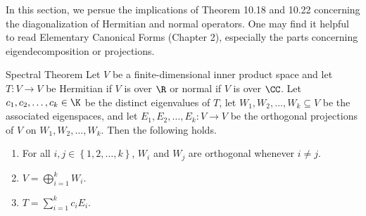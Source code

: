 \documentclass[linearalgebra]{subfiles}
\begin{document}
    \begin{remark}
        In this section, we persue the implications of Theorem 10.18 and 10.22 concerning the diagonalization of Hermitian and normal operators. One may find it helpful to read Elementary Canonical Forms (Chapter 2), especially the parts concerning eigendecomposition or projections.
    \end{remark}

    \begin{theorem}{Spectral Theorem}
        Let $V$ be a finite-dimensional inner product space and let $T:V\to V$ be Hermitian if $V$ is over $\R$ or normal if $V$ is over $\CC$. Let $c_1,c_2,\ldots,c_k\in\K$ be the distinct eigenvalues of $T$, let $W_1,W_2,\ldots,W_k\subseteq V$ be the associated eigenspaces, and let $E_1,E_2,\ldots,E_k:V\to V$ be the orthogonal projections of $V$ on $W_1,W_2,\ldots,W_k$. Then the following holds.
        \begin{enumerate}
            \item For all $i,j\in\left\lbrace 1,2,\ldots,k \right\rbrace$, $W_i$ and $W_j$ are orthogonal whenever $i\neq j$.
            \item $V = \bigoplus^{k}_{i=1} W_i$.
            \item $T = \sum^{k}_{i=1} c_iE_i$.
        \end{enumerate}
    \end{theorem}
\end{document}
